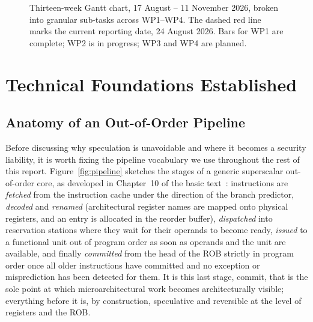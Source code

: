 \documentclass[11pt,a4paper]{article}
\begin{document}
\begin{figure}[h]
{}
\caption{Thirteen-week Gantt chart, 17 August -- 11 November 2026, broken into
granular sub-tasks across WP1--WP4. The dashed red line marks the current
reporting date, 24 August 2026. Bars for WP1 are complete; WP2 is in progress;
WP3 and WP4 are planned.}
\label{fig:gantt}
\end{figure}

\clearpage

\section{Technical Foundations Established}
\label{sec:techfound}

\subsection{Anatomy of an Out-of-Order Pipeline}
\label{sec:anatomy}

Before discussing why speculation is unavoidable and where it becomes a
security liability, it is worth fixing the pipeline vocabulary we use
throughout the rest of this report. Figure~\ref{fig:pipeline} sketches the
stages of a generic superscalar out-of-order core, as developed in Chapter~10
of the basic text~\cite{sarangi2025basic}: instructions are \emph{fetched}
from the instruction cache under the direction of the branch predictor,
\emph{decoded} and \emph{renamed} (architectural register names are mapped
onto physical registers, and an entry is allocated in the reorder buffer),
\emph{dispatched} into reservation stations where they wait for their
operands to become ready, \emph{issued} to a functional unit out of program
order as soon as operands and the unit are available, and finally
\emph{committed} from the head of the ROB strictly in program order once all
older instructions have committed and no exception or misprediction has been
detected for them. It is this last stage, commit, that is the sole point at
which microarchitectural work becomes architecturally visible; everything
before it is, by construction, speculative and reversible at the level of
registers and the ROB.
\end{document}
